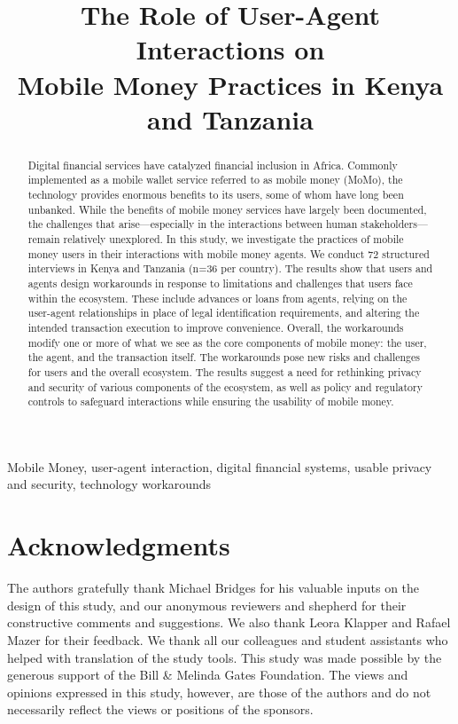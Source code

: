 \documentclass[conference,compsoc]{IEEEtran}
\author{\IEEEauthorblockN{Karen Sowon\IEEEauthorrefmark{1}, Edith Luhanga\IEEEauthorrefmark{2}, Lorrie Faith Cranor\IEEEauthorrefmark{1}, Giulia Fanti\IEEEauthorrefmark{1}, Conrad Tucker\IEEEauthorrefmark{1} and Assane Gueye\IEEEauthorrefmark{2}}
\IEEEauthorblockA{\IEEEauthorrefmark{1}
Carnegie Mellon University}
\IEEEauthorblockA{\IEEEauthorrefmark{2}Carnegie Mellon University-Africa}
}
\begin{document}


\title{The Role of User-Agent Interactions on\\ Mobile Money Practices in Kenya and Tanzania}
\maketitle

\begin{abstract}
Digital financial services have catalyzed financial inclusion in Africa. Commonly implemented as a mobile wallet service referred to as mobile money (MoMo), the technology provides enormous benefits to its users, some of whom have long been unbanked. While the benefits of mobile money services have largely been documented, the challenges that arise---especially in the interactions between human stakeholders---remain relatively unexplored. In this study, we investigate the practices of mobile money users in their interactions with mobile money agents. We conduct 72 structured interviews in Kenya and Tanzania (n=36 per country). The results show that users and agents design workarounds in response to limitations and challenges that users face within the ecosystem. These include advances or loans from  agents, relying on the user-agent relationships in place of legal identification requirements, and altering the intended transaction execution to improve convenience. Overall, the workarounds modify one or more of what we see as the core components of mobile money: the user, the agent, and the transaction itself.  The workarounds pose new risks and challenges for users and the overall ecosystem. The results suggest a need for rethinking privacy and security of various components of the ecosystem, as well as policy and regulatory controls to safeguard interactions while ensuring the usability of mobile money. 
\end{abstract}

\begin{IEEEkeywords}
Mobile Money, user-agent interaction, digital financial systems, usable privacy and security, technology workarounds
\end{IEEEkeywords}








\section*{Acknowledgments}
The authors gratefully thank Michael Bridges for his valuable inputs on the design of this study, and our anonymous reviewers and shepherd for their constructive comments and suggestions. We also thank Leora Klapper and Rafael Mazer for their feedback. We thank all our colleagues and student assistants who helped with translation of the study tools. This study was made possible by the generous support of the Bill \& Melinda Gates Foundation. The views and opinions expressed in this study, however, are those of the authors and do not necessarily reflect the views or positions of the sponsors. 

\normalem




\end{document}
